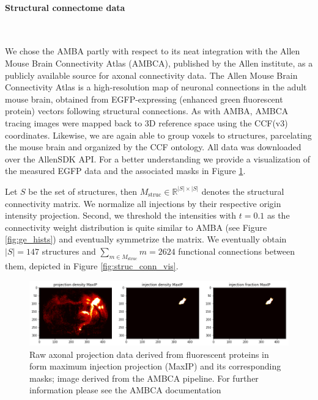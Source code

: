 \documentclass[]{article}
\renewcommand{\cite}{\citep}
\begin{document}
\paragraph{Structural connectome data}\mbox{}\\
\label{sec:struc_conn}

We chose the AMBA partly with respect to its neat integration with the Allen Mouse Brain Connectivity Atlas (AMBCA)\cite{oh2014mesoscale}, published by the Allen institute, as a publicly available source for axonal connectivity data. The Allen Mouse Brain Connectivity Atlas is a high-resolution map of neuronal connections in the adult mouse brain, obtained from EGFP-expressing (enhanced green fluorescent protein) vectors following structural connections. As with AMBA, AMBCA tracing images were mapped back to 3D reference space using the CCF(v3) coordinates. Likewise, we are again able to group voxels to structures, parcelating the mouse brain and organized by the CCF ontology. All data was downloaded over the AllenSDK API. For a better understanding we provide a visualization of the measured EGFP data and the associated masks in Figure \ref{fig:struc_conn}.

Let $S$ be the set of structures, then $M_{\text{struc}}\in\mathbb{R}^{|S|\times|S|}$ denotes the structural connectivity matrix. We normalize all injections by their respective origin intensity projection. Second, we threshold the intensities with $t=0.1$ as the connectivity weight distribution is quite similar to AMBA (see Figure \ref{fig:ge_hists}) and eventually symmetrize the matrix. We eventually obtain $|S|=147$ structures and $\sum_{m\in M_{\text{struc}} }m=2624$ functional connections between them, depicted in Figure \ref{fig:struc_conn_vis}.


\begin{figure}
	\centering
	\includegraphics[width=1.\linewidth]{figures/projection_data_visualization.png}
	\caption[Raw axonal projection data derived from fluorescent proteins]{Raw axonal projection data derived from fluorescent proteins in form maximum injection projection (MaxIP) and its corresponding masks; image derived from the AMBCA pipeline. For further information please see the AMBCA documentation}
	\label{fig:struc_conn}
\end{figure} 
\end{document}
